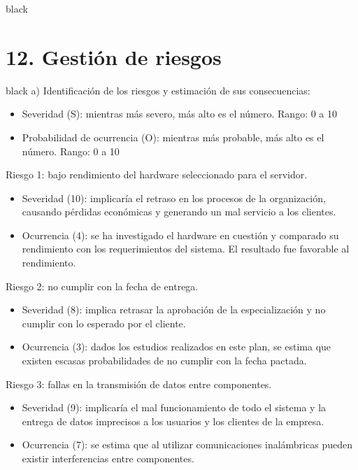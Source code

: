 \documentclass[11pt]{charter}
\begin{document}
\begin{consigna}{black}


\end{consigna}

\section{12. Gestión de riesgos}
\label{sec:riesgos}

\begin{consigna}{black}
a) Identificación de los riesgos y estimación de sus consecuencias:
 
\begin{itemize}
\item Severidad (S): mientras más severo, más alto es el número. Rango: 0 a 10\\
\item Probabilidad de ocurrencia (O): mientras más probable, más alto es el número. Rango: 0 a 10\\
\end{itemize}   

Riesgo 1: bajo rendimiento del hardware seleccionado para el servidor.
\begin{itemize}
\item Severidad (10): implicaría el retraso en los procesos de la organización, causando pérdidas económicas y generando un mal servicio a los clientes.
\item Ocurrencia (4): se ha investigado el hardware en cuestión y comparado su rendimiento con los requerimientos del sistema. El resultado fue favorable al rendimiento.
\end{itemize}

Riesgo 2: no cumplir con la fecha de entrega.
\begin{itemize}
\item Severidad (8): implica retrasar la aprobación de la especialización y no cumplir con lo esperado por el cliente.
\item Ocurrencia (3): dados los estudios realizados en este plan, se estima que existen escasas probabilidades de no cumplir con la fecha pactada. 
\end{itemize}

Riesgo 3: fallas en la transmisión de datos entre componentes.
\begin{itemize}
\item Severidad (9): implicaría el mal funcionamiento de todo el sistema y la entrega de datos imprecisos a los usuarios y los clientes de la empresa.
\item Ocurrencia (7): se estima que al utilizar comunicaciones inalámbricas pueden existir interferencias entre componentes.
\end{itemize}


\end{consigna}
\end{document}
